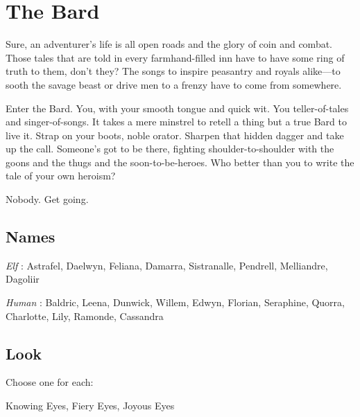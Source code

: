 \chapter{The Bard}
  
            

         

Sure, an adventurer’s life is all open roads and the glory of coin and combat. Those tales that are told in every farmhand-filled inn have to have some ring of truth to them, don’t they? The songs to inspire peasantry and royals alike—to sooth the savage beast or drive men to a frenzy have to come from somewhere.

         

Enter the Bard. You, with your smooth tongue and quick wit. You teller-of-tales and singer-of-songs. It takes a mere minstrel to retell a thing but a true Bard to live it. Strap on your boots, noble orator. Sharpen that hidden dagger and take up the call. Someone’s got to be there, fighting shoulder-to-shoulder with the goons and the thugs and the soon-to-be-heroes. Who better than you to write the tale of your own heroism?

         

Nobody. Get going.

       

       
\section{Names}   
       

         

           {\em Elf} : Astrafel, Daelwyn, Feliana, Damarra, Sistranalle, Pendrell, Melliandre, Dagoliir

         

           {\em Human} : Baldric, Leena, Dunwick, Willem, Edwyn, Florian, Seraphine, Quorra, Charlotte, Lily, Ramonde, Cassandra

       

       
\section{Look}  
       

         

Choose one for each:

         

Knowing Eyes, Fiery Eyes, Joyous Eyes

         

